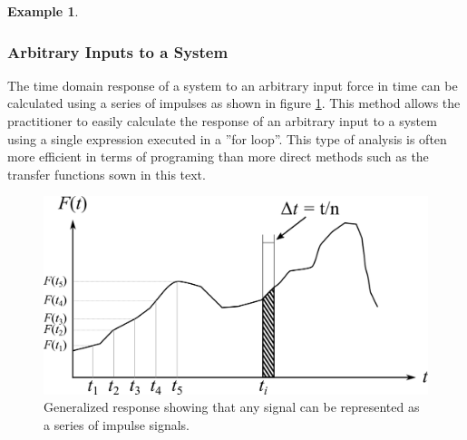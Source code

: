 \documentclass[12pt,letter]{article}
\newtheorem{ex}{Example}
\numberwithin{ex}{section} %
\newenvironment{example}{\begin{mdframed}[middlelinewidth=0.5mm]\begin{ex}\normalfont}{\end{ex}\end{mdframed}}
\numberwithin{re}{section} %
\begin{document}
\begin{example}

\end{example}

\subsubsection{Arbitrary Inputs to a System}
\label{sec:impulse_inputs}
The time domain response of a system to an arbitrary input force in time can be calculated using a series of impulses as shown in figure \ref{fig:Arbitary_excitation_forces}. This method allows the practitioner to easily calculate the response of an arbitrary input to a system using a single expression executed in a ''for loop''. This type of analysis is often more efficient in terms of programing than more direct methods such as the transfer functions sown in this text. 

\begin{figure}[H]
	\centering
	\includegraphics[]{../figures/Arbitary_excitation_forces.png}
	\caption{Generalized response showing that any signal can be represented as a series of impulse signals. }
	\label{fig:Arbitary_excitation_forces}
\end{figure}
\end{document}
